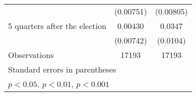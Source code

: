 \begin{table}[htbp]
\begin{tabular}{l*{2}{c}}
                    &   (0.00751)         &   (0.00805)         \\
[1em]
 5 quarters after the election&     0.00430         &      0.0347\sym{***}\\
                    &   (0.00742)         &    (0.0104)         \\
\hline
Observations        &       17193         &       17193         \\
\hline\hline
\multicolumn{3}{l}{\footnotesize Standard errors in parentheses}\\
\multicolumn{3}{l}{\footnotesize \sym{*} \(p<0.05\), \sym{**} \(p<0.01\), \sym{***} \(p<0.001\)}\\
\end{tabular}
\end{table}
